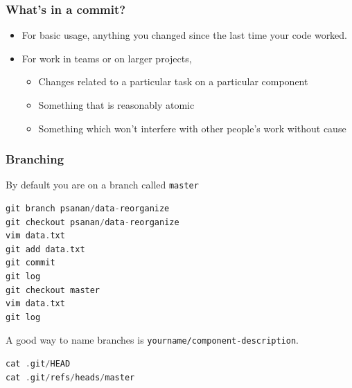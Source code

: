 \documentclass{beamer}
\begin{document}
\begin{frame}[fragile]
\frametitle{What's in a commit?}
\begin{itemize}
\item For basic usage, anything you changed since the last time your code worked.
\item For work in teams or on larger projects,
\begin{itemize}
\item Changes related to a particular task on a particular component
\item Something that is reasonably atomic
\item Something which won't interfere with other people's work without cause
\end{itemize}
\end{itemize}
\end{frame}

\begin{frame}[fragile]
\frametitle{Branching}
By default you are on a branch called \texttt{master}
\begin{lstlisting}[language=C++]
git branch psanan/data-reorganize
git checkout psanan/data-reorganize
vim data.txt
git add data.txt
git commit
git log
git checkout master
vim data.txt
git log
\end{lstlisting}
A good way to name branches is \lstinline{yourname/component-description}.
\end{frame}





\begin{lstlisting}[language=C++]
cat .git/HEAD
cat .git/refs/heads/master
\end{lstlisting}

\end{document}
